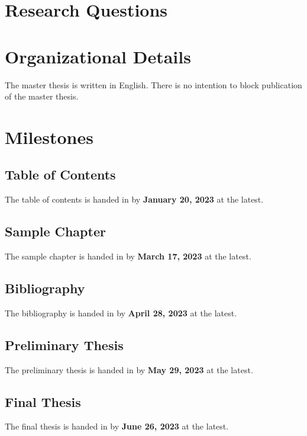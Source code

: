\documentclass[english,notitlepage,smartquotes]{hgbreport}
\begin{document}
\section{Research Questions}


\section{Organizational Details}

The master thesis is written in English.
There is no intention to block publication of the master thesis.

\section{Milestones}

\subsection{Table of Contents}

The table of contents is handed in by \textbf{January 20, 2023} at the latest.

\subsection{Sample Chapter}

The sample chapter is handed in by \textbf{March 17, 2023} at the latest.

\subsection{Bibliography}

The bibliography is handed in by \textbf{April 28, 2023} at the latest.

\subsection{Preliminary Thesis}

The preliminary thesis is handed in by \textbf{May 29, 2023} at the latest.

\subsection{Final Thesis}

The final thesis is handed in by \textbf{June 26, 2023} at the latest.
\end{document}
